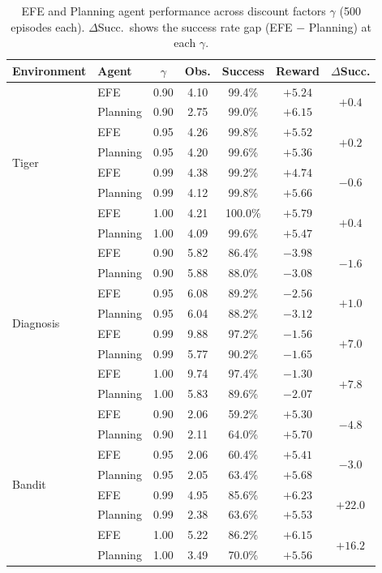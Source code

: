\documentclass[runningheads]{llncs}
\begin{document}
\begin{table}[h]
\centering
\caption{EFE and Planning agent performance across discount factors $\gamma$ (500 episodes each). $\Delta$Succ.\ shows the success rate gap (EFE $-$ Planning) at each $\gamma$.}
\label{tab:discount}
\begin{small}
\begin{tabular}{llccccc}
\toprule
Environment & Agent & $\gamma$ & Obs. & Success & Reward & $\Delta$Succ. \\
\midrule
\multirow{8}{*}{Tiger}
& EFE & 0.90 & 4.10 & 99.4\% & $+5.24$ & \multirow{2}{*}{$+0.4$} \\
& Planning & 0.90 & 2.75 & 99.0\% & $+6.15$ & \\
& EFE & 0.95 & 4.26 & 99.8\% & $+5.52$ & \multirow{2}{*}{$+0.2$} \\
& Planning & 0.95 & 4.20 & 99.6\% & $+5.36$ & \\
& EFE & 0.99 & 4.38 & 99.2\% & $+4.74$ & \multirow{2}{*}{$-0.6$} \\
& Planning & 0.99 & 4.12 & 99.8\% & $+5.66$ & \\
& EFE & 1.00 & 4.21 & 100.0\% & $+5.79$ & \multirow{2}{*}{$+0.4$} \\
& Planning & 1.00 & 4.09 & 99.6\% & $+5.47$ & \\
\midrule
\multirow{8}{*}{Diagnosis}
& EFE & 0.90 & 5.82 & 86.4\% & $-3.98$ & \multirow{2}{*}{$-1.6$} \\
& Planning & 0.90 & 5.88 & 88.0\% & $-3.08$ & \\
& EFE & 0.95 & 6.08 & 89.2\% & $-2.56$ & \multirow{2}{*}{$+1.0$} \\
& Planning & 0.95 & 6.04 & 88.2\% & $-3.12$ & \\
& EFE & 0.99 & 9.88 & 97.2\% & $-1.56$ & \multirow{2}{*}{$+7.0$} \\
& Planning & 0.99 & 5.77 & 90.2\% & $-1.65$ & \\
& EFE & 1.00 & 9.74 & 97.4\% & $-1.30$ & \multirow{2}{*}{$+7.8$} \\
& Planning & 1.00 & 5.83 & 89.6\% & $-2.07$ & \\
\midrule
\multirow{8}{*}{Bandit}
& EFE & 0.90 & 2.06 & 59.2\% & $+5.30$ & \multirow{2}{*}{$-4.8$} \\
& Planning & 0.90 & 2.11 & 64.0\% & $+5.70$ & \\
& EFE & 0.95 & 2.06 & 60.4\% & $+5.41$ & \multirow{2}{*}{$-3.0$} \\
& Planning & 0.95 & 2.05 & 63.4\% & $+5.68$ & \\
& EFE & 0.99 & 4.95 & 85.6\% & $+6.23$ & \multirow{2}{*}{$+22.0$} \\
& Planning & 0.99 & 2.38 & 63.6\% & $+5.53$ & \\
& EFE & 1.00 & 5.22 & 86.2\% & $+6.15$ & \multirow{2}{*}{$+16.2$} \\
& Planning & 1.00 & 3.49 & 70.0\% & $+5.56$ & \\
\bottomrule
\end{tabular}
\end{small}
\end{table}
\end{document}
